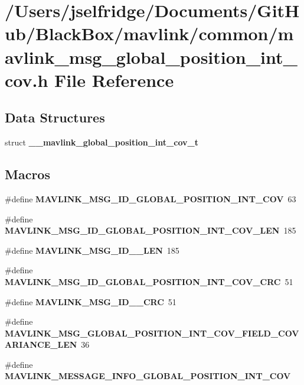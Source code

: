 \section{/\+Users/jselfridge/\+Documents/\+Git\+Hub/\+Black\+Box/mavlink/common/mavlink\+\_\+msg\+\_\+global\+\_\+position\+\_\+int\+\_\+cov.h File Reference}
\label{mavlink__msg__global__position__int__cov_8h}
\subsection*{Data Structures}
\begin{DoxyCompactItemize}
\item 
struct \textbf{ \+\_\+\+\_\+mavlink\+\_\+global\+\_\+position\+\_\+int\+\_\+cov\+\_\+t}
\end{DoxyCompactItemize}
\subsection*{Macros}
\begin{DoxyCompactItemize}
\item 
\#define \textbf{ M\+A\+V\+L\+I\+N\+K\+\_\+\+M\+S\+G\+\_\+\+I\+D\+\_\+\+G\+L\+O\+B\+A\+L\+\_\+\+P\+O\+S\+I\+T\+I\+O\+N\+\_\+\+I\+N\+T\+\_\+\+C\+OV}~63
\item 
\#define \textbf{ M\+A\+V\+L\+I\+N\+K\+\_\+\+M\+S\+G\+\_\+\+I\+D\+\_\+\+G\+L\+O\+B\+A\+L\+\_\+\+P\+O\+S\+I\+T\+I\+O\+N\+\_\+\+I\+N\+T\+\_\+\+C\+O\+V\+\_\+\+L\+EN}~185
\item 
\#define \textbf{ M\+A\+V\+L\+I\+N\+K\+\_\+\+M\+S\+G\+\_\+\+I\+D\+\_\+\_\+\+L\+EN}~185
\item 
\#define \textbf{ M\+A\+V\+L\+I\+N\+K\+\_\+\+M\+S\+G\+\_\+\+I\+D\+\_\+\+G\+L\+O\+B\+A\+L\+\_\+\+P\+O\+S\+I\+T\+I\+O\+N\+\_\+\+I\+N\+T\+\_\+\+C\+O\+V\+\_\+\+C\+RC}~51
\item 
\#define \textbf{ M\+A\+V\+L\+I\+N\+K\+\_\+\+M\+S\+G\+\_\+\+I\+D\+\_\+\_\+\+C\+RC}~51
\item 
\#define \textbf{ M\+A\+V\+L\+I\+N\+K\+\_\+\+M\+S\+G\+\_\+\+G\+L\+O\+B\+A\+L\+\_\+\+P\+O\+S\+I\+T\+I\+O\+N\+\_\+\+I\+N\+T\+\_\+\+C\+O\+V\+\_\+\+F\+I\+E\+L\+D\+\_\+\+C\+O\+V\+A\+R\+I\+A\+N\+C\+E\+\_\+\+L\+EN}~36
\item 
\#define \textbf{ M\+A\+V\+L\+I\+N\+K\+\_\+\+M\+E\+S\+S\+A\+G\+E\+\_\+\+I\+N\+F\+O\+\_\+\+G\+L\+O\+B\+A\+L\+\_\+\+P\+O\+S\+I\+T\+I\+O\+N\+\_\+\+I\+N\+T\+\_\+\+C\+OV}
\end{DoxyCompactItemize}
